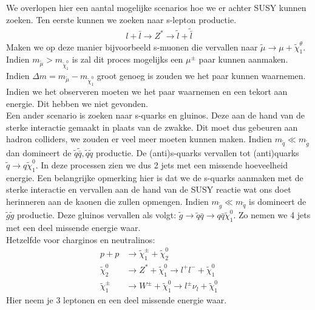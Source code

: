 \documentclass[../main.tex]{subfiles}
\begin{document}
We overlopen hier een aantal mogelijke scenarios hoe we er achter SUSY kunnen zoeken. Ten eerste kunnen we zoeken naar s-lepton productie.
\begin{equation}
    \begin{aligned}
        \label{eq:slepton_productie}
        l+\bar{l} \rightarrow Z^{*} \rightarrow \tilde{l}+\tilde{\bar{l}}
    \end{aligned}
\end{equation}
Maken we op deze manier bijvoorbeeld s-muonen die vervallen naar $\tilde{\mu} \rightarrow \mu+\tilde{\chi}_{1}^{\theta}$. Indien $m_{\tilde{\mu}}>m_{\tilde{\chi}_{1}^{0}}$ is zal dit proces mogelijks een $\mu^\pm$ paar kunnen aanmaken. Indien $\Delta m=m_{\tilde{\mu}}-m_{\tilde{\chi}_{1}^{0}}$ groot genoeg is zouden we het paar kunnen waarnemen. Indien we het observeren moeten we het paar waarnemen en een tekort aan energie. Dit hebben we niet gevonden.\\
Een ander scenario is zoeken naar s-quarks en gluinos. Deze aan de hand van de sterke interactie gemaakt in plaats van de zwakke. Dit moet dus gebeuren aan hadron colliders, we zouden er veel meer moeten kunnen maken. Indien $m_{\tilde{q}} \ll m_{\tilde{g}}$ dan domineert de $\tilde{q} \tilde{\bar{q}}, \tilde{q} \tilde{q}$ productie. De (anti)s-quarks vervallen tot (anti)quarks $\tilde{q} \rightarrow q \tilde{\chi}_{1}^{0}$. In deze processen zien we dus 2 jets met een missende hoeveelheid energie. Een belangrijke opmerking hier is dat we de s-quarks aanmaken met de sterke interactie en vervallen aan de hand van de SUSY reactie wat ons doet herinneren aan de kaonen die zullen opmengen. Indien $m_{\tilde{g}} \ll m_{\tilde{q}}$ is domineert de $\tilde{g} \tilde{g}$ productie. Deze gluinos vervallen als volgt: $\tilde{g} \rightarrow \tilde{q} \bar{q} \rightarrow q \bar{q} \tilde{\chi}_{1}^{0}$. Zo nemen we 4 jets met een deel missende energie waar.\\
Hetzelfde voor charginos en neutralinos:
\begin{equation}
    \begin{aligned}
        \label{eq:char_neutr_prod}
        p+p & \rightarrow \tilde{\chi}_{1}^{\pm}+\tilde{\chi}_{2}^{0} \\
        \tilde{\chi}_{2}^{0} & \rightarrow Z^{*}+\tilde{\chi}_{1}^{0} \rightarrow l^{+} l^{-}+\tilde{\chi}_{1}^{0} \\
        \tilde{\chi}_{1}^{\pm} & \rightarrow W^{\pm}+\tilde{\chi}_{1}^{0} \rightarrow l^{\pm} \nu_{l}+\tilde{\chi}_{1}^{0}
    \end{aligned}
\end{equation}
Hier neem je 3 leptonen en een deel missende energie waar.
\end{document}
